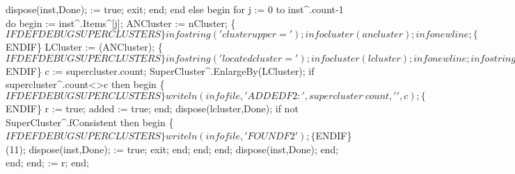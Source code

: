                   dispose(inst,Done);
                   := true;
                  exit;
               end;
            end
            else
            begin
               for j := 0 to inst^.count-1 do
               begin
                   := inst^.Items^[j];
                  ANCluster := nCluster;
                  \{$IFDEF DEBUGSUPERCLUSTERS\}
                  infostring('clusterupper=');
                  infocluster(ancluster);
                  infonewline;
                  \{$ENDIF\}
                  LCluster := (ANCluster);
                  \{$IFDEF DEBUGSUPERCLUSTERS\}
                  infostring('locatedcluster=');
                  infocluster(lcluster);
                  infonewline;
                  infostring('supercluster=');
                  infocluster(supercluster);
                  infonewline;
                  \{$ENDIF\}
                  c := supercluster.count;
                  SuperCluster^.EnlargeBy(LCluster);
                  if supercluster^.count<>c then
                  begin
                     \{$IFDEF DEBUGSUPERCLUSTERS\}
                     writeln(infofile,'ADDEDF2:',supercluster^.count,' ',c);
                     \{$ENDIF\}
                     r := true;
                     added := true;
                  end;
                  dispose(lcluster,Done);
                  if not SuperCluster^.fConsistent then
                  begin
                     \{$IFDEF DEBUGSUPERCLUSTERS\}
                     writeln(infofile,'FOUNDF2');
                     \{$ENDIF\}
                     (11);
                     dispose(inst,Done);
                      := true;
                     exit;
                  end;
               end;
            end;
            dispose(inst,Done);
         end;
      end;
   end;
    := r;
end;
\eatline
